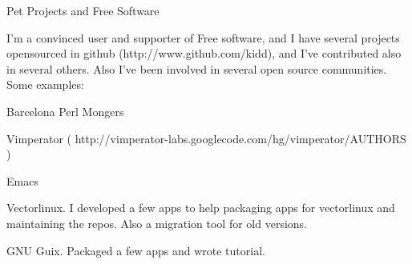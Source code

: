 \documentclass{resume} %
\begin{document}
\begin{rSection}{Pet Projects and Free Software}

  I'm a convinced user and supporter of Free software, and I have
  several projects opensourced in github (http://www.github.com/kidd),
  and I've contributed also in several others. Also I've been
  involved in several open source communities. Some examples:

\item Barcelona Perl Mongers
\item Vimperator ( http://vimperator-labs.googlecode.com/hg/vimperator/AUTHORS )
\item Emacs
\item Vectorlinux. I developed a few apps to help packaging apps for vectorlinux and maintaining the repos. Also a migration tool for old versions.
\item GNU Guix. Packaged a few apps and wrote tutorial.

\end{rSection}





\end{document}
